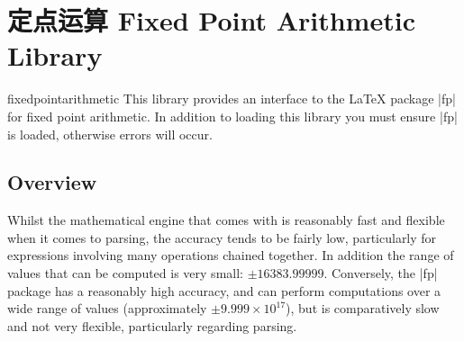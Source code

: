 %
%
%


\section{定点运算 Fixed Point Arithmetic Library}

\begin{pgflibrary}{fixedpointarithmetic}
    This library provides an interface to the \LaTeX{} package |fp| for fixed
    point arithmetic. In addition to loading this library you must ensure |fp|
    is loaded, otherwise errors will occur.
\end{pgflibrary}


\subsection{Overview}

Whilst the mathematical engine that comes with \pgfname{} is reasonably fast
and flexible when it comes to parsing, the accuracy tends to be fairly low,
particularly for expressions involving many operations chained together. In
addition the range of values that can be computed is very small:
$\pm16383.99999$. Conversely, the |fp| package has a reasonably high accuracy,
and can perform computations over a wide range of values (approximately
$\pm9.999\times10^{17}$), but is comparatively slow and not very flexible,
particularly regarding parsing.

